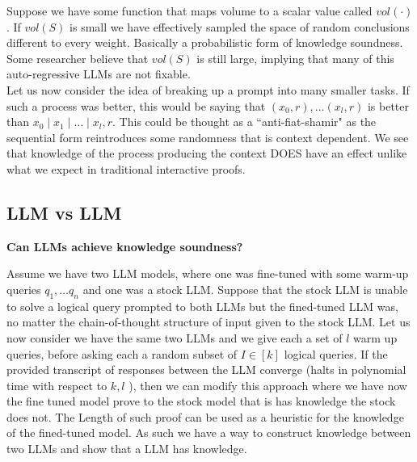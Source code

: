 \documentclass{article}
\begin{document}
Suppose we have some function that maps volume to a scalar value called \(vol(\cdot)\). If \(vol(S)\) is small we have effectively sampled the space of random conclusions different to every weight. Basically a probabilistic form of knowledge soundness. Some researcher believe that \(vol(S)\) is still large, implying that many of this auto-regressive LLMs are not fixable.  \\ 

Let us now consider the idea of breaking up a prompt into many smaller tasks. If such a process was better, this would be saying that \((x_0, r), \ldots (x_l, r) \) is better than \(x_0 \mid x_1 \mid \ldots \mid x_l, r\). This could be thought as a ``anti-fiat-shamir" as the sequential form reintroduces some randomness that is context dependent. We see that knowledge of the process producing the context DOES have an effect unlike what we expect in traditional interactive proofs. 

\subsection{LLM vs LLM}

\textbf{Can LLMs achieve knowledge soundness?}

Assume we have two LLM models, where one was fine-tuned with some warm-up queries \(q_1, \ldots q_n\) and one was a stock LLM. Suppose that the stock LLM is unable to solve a logical query prompted to both LLMs but the fined-tuned LLM was, no matter the chain-of-thought structure of input given to the stock LLM. Let us now consider we have the same two LLMs and we give each a set of \(l\) warm up queries, before asking each a random subset of \(I \in [k]\)  logical queries. If the provided transcript of responses between the LLM converge (halts in polynomial time with respect to \(k, l\) ), then we can modify this approach where we have now the fine tuned model prove to the stock model that is has knowledge the stock does not. The Length of such proof can be used as a heuristic for the knowledge of the fined-tuned model. As such we have a way to construct knowledge between two LLMs and show that a LLM has knowledge. 
\end{document}
